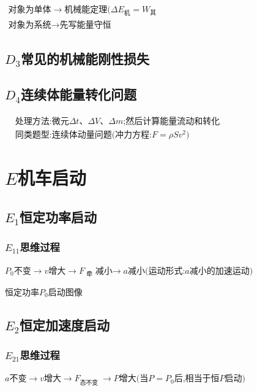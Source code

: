 \documentclass[lang=cn,10pt]{elegantbook}
\begin{document}
		      $\begin{aligned}\text{对象为单体}\to\text{机械能定理(}\Delta E_\text{机}=W_{\text{其}}\\\text{对象为系统}\to\text{先写能量守恒}\end{aligned}$
		      
		      \subsection{$D_3$常见的机械能刚性损失}
		      \vspace{3cm}
		      
		      \subsection{$D_4$连续体能量转化问题}
		      
		      $\begin{aligned}&\text{处理方法:微元}\Delta t\text{、}\Delta V\text{、}\Delta m\text{;然后计算能量流动和转化}\\&\text{同类题型:连续体动量问题(冲力方程:}F=\rho Sv^2)\end{aligned}$
		     
		       \section{$E$机车启动}
		       \subsection{$E_1$恒定功率启动}
		       \subsubsection{$E_{11}$思维过程}
		       
		       $ P_0\text{不变}\to v\text{增大}\to F_\text{ 牵}{\text{减小}\to}a\text{减小(运动形式:}a\text{减小的加速运动)}$
		       
		       恒定功率$P_0$启动图像
		       
		       \vspace{3cm}
		       
		       \subsection{$E_2$恒定加速度启动}	       
		       \subsubsection{$E_{21}$思维过程}
		       $a\text{不变}\to v\text{增大}\to F_\text{态不变 }\to P\text{增大(当}P=P_0\text{后,相当于恒}P\text{启动})$
		       
\end{document}
